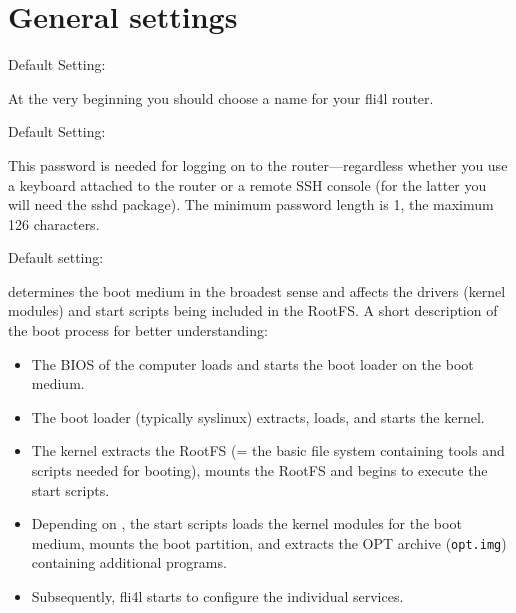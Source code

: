 
\section{General settings}

\begin{description}


  Default Setting: 
  
  At the very beginning you should choose a name for your fli4l router.



  Default Setting: 
  
  This password is needed for logging on to the router---regardless whether
  you use a keyboard attached to the router or a remote SSH console
  (for the latter you will need the sshd package). The minimum password
  length is 1, the maximum 126 characters.


  Default setting: 

   determines the boot medium in the broadest sense and
  affects the drivers (kernel modules) and start scripts being included in
  the RootFS. A short description of the boot process for
  better understanding:

  \begin{itemize}
  \item The BIOS of the computer loads and starts the boot loader on the boot
        medium.
  \item The boot loader (typically syslinux) extracts, loads, and starts the
        kernel.
  \item The kernel extracts the RootFS (= the basic file system containing
        tools and scripts needed for booting), mounts the RootFS and begins to
        execute the start scripts.
  \item Depending on , the start scripts loads the kernel modules
        for the boot medium, mounts the boot partition, and extracts the OPT
        archive (\texttt{opt.img}) containing additional programs.
  \item Subsequently, fli4l starts to configure the individual services.
  \end{itemize}


\end{description}
